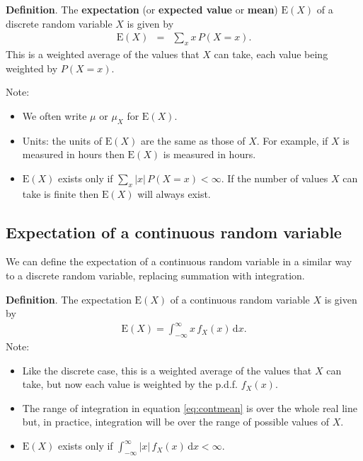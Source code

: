 \documentclass[
  11pt,
  british,
  openany, a4paper]{book}
\providecommand{\tightlist}{%
  \setlength{\itemsep}{0pt}\setlength{\parskip}{0pt}}
\begin{document}
\textbf{Definition}. The \textbf{expectation} (or \textbf{expected value} or \textbf{mean}) \(\mathrm{E}(X)\) of a discrete random variable \(X\) is given by
\begin{eqnarray}
\mathrm{E}(X) &=& \sum_x x\,P(X=x). 
\label{eq:discmean}
\end{eqnarray}
This is a weighted average of the values that \(X\) can take, each value being weighted by \(P(X=x)\).

Note:

\begin{itemize}
\tightlist
\item
  We often write \(\mu\) or \(\mu_X\) for \(\mathrm{E}(X)\).
\item
  Units: the units of \(\mathrm{E}(X)\) are the same as those of \(X\). For example, if \(X\) is measured in hours then \(\mathrm{E}(X)\) is measured in hours.
\item
  \(\mathrm{E}(X)\) exists only if \(\sum_x |x|\,P(X=x) < \infty\). If the number of values \(X\) can take is finite then \(\mathrm{E}(X)\) will always exist.
\end{itemize}

\hypertarget{expectation-of-a-continuous-random-variable}{%
\subsection{Expectation of a continuous random variable}\label{expectation-of-a-continuous-random-variable}}

We can define the expectation of a continuous random variable in a similar way to a discrete random variable, replacing summation with integration.

\textbf{Definition}.
The expectation \(\mathrm{E}(X)\) of a continuous random variable \(X\) is given by
\begin{eqnarray}
\mathrm{E}(X) = \int_{-\infty}^{\infty} x\,f_X(x) \,\mathrm{d}x. 
\label{eq:contmean}
\end{eqnarray}
Note:

\begin{itemize}
\tightlist
\item
  Like the discrete case, this is a weighted average of the values that \(X\) can take, but now each value is weighted by the
  p.d.f. \(f_X(x)\).
\item
  The range of integration in equation \eqref{eq:contmean} is over the whole real line but, in practice, integration will be over the range of possible values of \(X\).
\item
  \(\mathrm{E}(X)\) exists only if \(\int_{-\infty}^{\infty} |x|\,f_X(x) \,\mathrm{d}x < \infty\).
\end{itemize}
\end{document}
